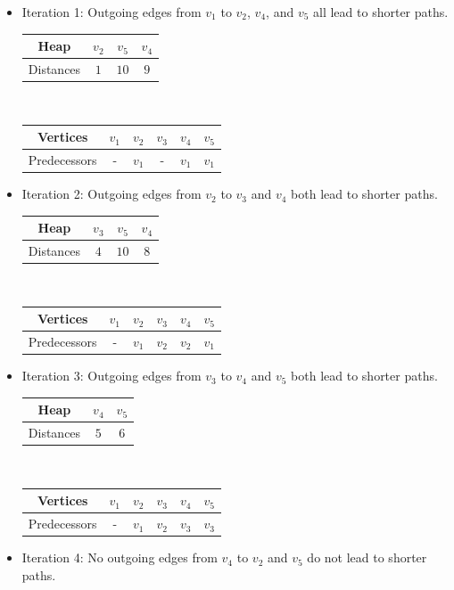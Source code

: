 \begin{table}[h]
\begin{minipage}[t]{0.45 \textwidth}
\begin{itemize}
	\item Iteration 1: Outgoing edges from $v_1$ to $v_2$, $v_4$, and $v_5$
		all lead to shorter paths.
	
	\begin{tabular}{|c|ccc|}
			\hline
			     Heap & $v_2$ & $v_5$ & $v_4$ \tabularnewline
			\hline
			Distances &  $1$  &  $10$ &  $9$ \tabularnewline
			\hline
	\end{tabular}\\
	\begin{tabular}{|c|ccccc|}
			\hline
			     Vertices & $v_1$ & $v_2$ & $v_3$ & $v_4$ & $v_5$ \tabularnewline
			\hline
			Predecessors &  -  &  $v_1$ &  - &     $v_1$ &    $v_1$ \tabularnewline
			\hline
	\end{tabular}


	\item Iteration 2: Outgoing edges from $v_2$ to $v_3$ and $v_4$
		both lead to shorter paths.
	
	\begin{tabular}{|c|ccc|}
			\hline
			     Heap & $v_3$ & $v_5$  &  $v_4$  \tabularnewline
			\hline
			Distances &  $4$  &  $10$  &  $8$  \tabularnewline
			\hline
	\end{tabular}\\
	\begin{tabular}{|c|ccccc|}
			\hline
			     Vertices & $v_1$ & $v_2$ & $v_3$ & $v_4$ & $v_5$ \tabularnewline
			\hline
			Predecessors &  -  &  $v_1$ &  $v_2$ &     $v_2$ &    $v_1$ \tabularnewline
			\hline
	\end{tabular}


	\item Iteration 3: Outgoing edges from $v_3$ to $v_4$ and $v_5$
		both lead to shorter paths.
	
	\begin{tabular}{|c|cc|}
			\hline
			     Heap & $v_4$ & $v_5$  \tabularnewline
			\hline
			Distances &  $5$  &  $6$   \tabularnewline
			\hline
	\end{tabular}\\
	\begin{tabular}{|c|ccccc|}
			\hline
			     Vertices & $v_1$ & $v_2$ & $v_3$ & $v_4$ & $v_5$ \tabularnewline
			\hline
			Predecessors &  -  &  $v_1$ &  $v_2$ &     $v_3$ &    $v_3$ \tabularnewline
			\hline
	\end{tabular}


	\item Iteration 4: No outgoing edges from $v_4$ to $v_2$ and $v_5$
		do not lead to shorter paths.
	

\end{itemize}
\end{minipage}
\end{table}
